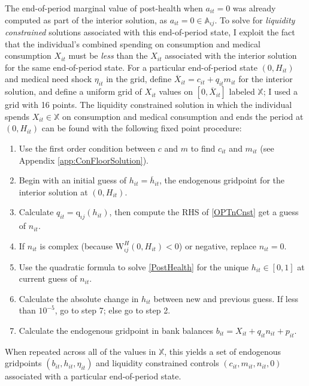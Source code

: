 \documentclass[12pt,pdftex,letterpaper]{article}
\newcommand{\Type}{\iota}
\newcommand{\Health}{h}
\newcommand{\PostHealth}{H}
\newcommand{\PostValue}{\text{W}}
\newcommand{\Con}{c}
\newcommand{\Care}{m}
\newcommand{\Invst}{n}
\newcommand{\Xpend}{X}
\newcommand{\Bank}{b}
\newcommand{\Assets}{a}
\newcommand{\Premium}{p}
\newcommand{\Copay}{q}
\newcommand{\CopayFunc}{\text{\Copay}}
\newcommand{\Age}{j}
\newcommand{\MedShk}{\eta}
\begin{document}
The end-of-period marginal value of post-health when $\Assets_{it}=0$ was already computed as part of the interior solution, as $\Assets_{it}=0 \in \mathbb{A}_{\Type \Age}$.  To solve for \textit{liquidity constrained} solutions associated with this end-of-period state, I exploit the fact that the individual's combined spending on consumption and medical consumption $\Xpend_{it}$ must be \textit{less} than the $\Xpend_{it}$ associated with the interior solution for the same end-of-period state.  For a particular end-of-period state $(0,\PostHealth_{it})$ and medical need shock $\MedShk_{it}$ in the grid, define $\overline{\Xpend}_{it} = \Con_{it} + \Copay_{it} \Care_{it}$ for the interior solution, and define a uniform grid of $\Xpend_{it}$ values on $[0,\overline{\Xpend}_{it}]$ labeled $\mathbb{X}$; I used a grid with 16 points.  The liquidity constrained solution in which the individual spends $\Xpend_{it} \in \mathbb{X}$ on consumption and medical consumption and ends the period at $(0,\PostHealth_{it})$ can be found with the following fixed point procedure:
\begin{enumerate}
\item Use the first order condition between $\Con$ and $\Care$ to find $\Con_{it}$ and $\Care_{it}$ (see Appendix \ref{app:ConFloorSolution}).

\item Begin with an initial guess of $\Health_{it} = \overline{\Health}_{it}$, the endogenous gridpoint for the interior solution at $(0,\PostHealth_{it})$.

\item Calculate $\Copay_{it} = \CopayFunc_{\Type \Age}(\Health_{it})$, then compute the RHS of \eqref{OPTnCnst} get a guess of $\Invst_{it}$.

\item If $\Invst_{it}$ is complex (because $\PostValue^\PostHealth_{\Type \Age}(0,\PostHealth_{it}) < 0$) or negative, replace $\Invst_{it} = 0$.

\item Use the quadratic formula to solve \eqref{PostHealth} for the unique $\Health_{it} \in [0,1]$ at current guess of $\Invst_{it}$.

\item Calculate the absolute change in $\Health_{it}$ between new and previous guess.  If less than $10^{-5}$, go to step 7; else go to step 2.

\item Calculate the endogenous gridpoint in bank balances $\Bank_{it} = \Xpend_{it} + \Copay_{it} \Invst_{it} + \Premium_{it}$.
\end{enumerate}
When repeated across all of the values in $\mathbb{X}$, this yields a set of endogenous gridpoints $(\Bank_{it},\Health_{it},\MedShk_{it})$ and liquidity constrained controls $(\Con_{it},\Care_{it},\Invst_{it},0)$ associated with a particular end-of-period state.
\end{document}
